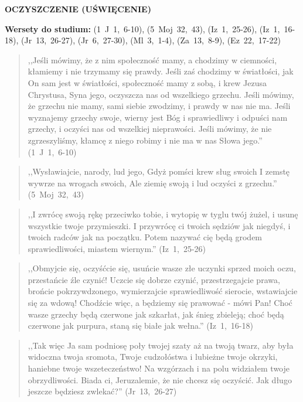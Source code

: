 \documentclass[10pt,a4paper,oneside]{article}
\begin{document}
\centerline{\textbf{\MakeUppercase{Oczyszczenie (uświęcenie)}}}
\begin{center}
\textbf{Wersety do studium:} \mbox{(1 J 1, 6-10)}, \mbox{(5 Moj 32, 43)}, \mbox{(Iz 1, 25-26)}, \mbox{(Iz 1, 16-18)}, \mbox{(Jr 13, 26-27)}, \mbox{(Jr 6, 27-30)}, \mbox{(Ml 3, 1-4)}, \mbox{(Za 13, 8-9)}, \mbox{(Ez 22, 17-22)}
\end{center}
\begin{quote}
,,Jeśli mówimy, że z nim społeczność mamy, a chodzimy w ciemności, kłamiemy i nie trzymamy się prawdy. Jeśli zaś chodzimy w światłości, jak On sam jest w światłości, społeczność mamy z sobą, i krew Jezusa Chrystusa, Syna jego, oczyszcza nas od wszelkiego grzechu. Jeśli mówimy, że grzechu nie mamy, sami siebie zwodzimy, i prawdy w nas nie ma. Jeśli wyznajemy grzechy swoje, wierny jest Bóg i sprawiedliwy i odpuści nam grzechy, i oczyści nas od wszelkiej nieprawości. Jeśli mówimy, że nie zgrzeszyliśmy, kłamcę z niego robimy i nie ma w nas Słowa jego.'' \mbox{(1 J 1, 6-10)}
\end{quote}
\begin{quote}
,,Wysławiajcie, narody, lud jego, Gdyż pomści krew sług swoich I zemstę wywrze na wrogach swoich, Ale ziemię swoją i lud oczyści z grzechu.'' \mbox{(5 Moj 32, 43)}
\end{quote}
\begin{quote}
,,I zwrócę swoją rękę przeciwko tobie, i wytopię w tyglu twój żużel, i usunę wszystkie twoje przymieszki. I przywrócę ci twoich sędziów jak niegdyś, i twoich radców jak na początku. Potem nazywać cię będą grodem sprawiedliwości, miastem wiernym.'' \mbox{(Iz 1, 25-26)}
\end{quote}
\begin{quote}
,,Obmyjcie się, oczyśćcie się, usuńcie wasze złe uczynki sprzed moich oczu, przestańcie źle czynić! Uczcie się dobrze czynić, przestrzegajcie prawa, brońcie pokrzywdzonego, wymierzajcie sprawiedliwość sierocie, wstawiajcie się za wdową! Chodźcie więc, a będziemy się prawować - mówi Pan! Choć wasze grzechy będą czerwone jak szkarłat, jak śnieg zbieleją; choć będą czerwone jak purpura, staną się białe jak wełna.'' \mbox{(Iz 1, 16-18)}
\end{quote}
\begin{quote}
,,Tak więc Ja sam podniosę poły twojej szaty aż na twoją twarz, aby była widoczna twoja sromota, Twoje cudzołóstwa i lubieżne twoje okrzyki, haniebne twoje wszeteczeństwo! Na wzgórzach i na polu widziałem twoje obrzydliwości. Biada ci, Jeruzalemie, że nie chcesz się oczyścić. Jak długo jeszcze będziesz zwlekać?'' \mbox{(Jr 13, 26-27)}
\end{quote}
\end{document}
